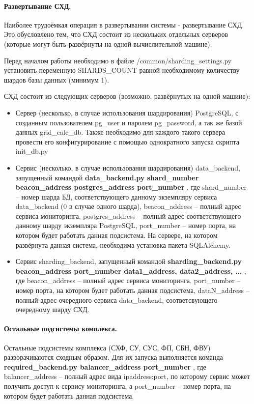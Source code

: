 \documentclass[a4paper,12pt]{report}
\numberwithin{equation}{section}
\begin{document}
  \paragraph{Развертывание СХД.}
  Наиболее трудоёмкая операция в развертывании системы - развертывание СХД. 
  Это обусловлено тем, что СХД состоит из нескольких отдельных серверов (которые могут быть развёрнуты на одной вычислительной машине).
  
  Перед началом работы необходимо в файле /common/sharding\_settings.py установить переменную SHARDS\_COUNT равной необходимому количеству шардов базы данных (минимум 1).
  
  СХД состоит из следующих серверов (возможно, развёрнутых на одной машине):
  \begin{itemize}
    \item Сервер (несколько, в случае использования шардирования) PostgreSQL, с созданным пользователем pg\_user и паролем pg\_password, а так же базой данных grid\_calc\_db. Также необходимо для каждого такого сервера провести его конфигурирование с помощью однократного запуска скрипта init\_db.py
    \item Сервис (несколько, в случае использования шардирования) data\_backend, запущенный командой 
    \textbf{ data\_backend.py shard\_number beacon\_address postgres\_address port\_number },
    где shard\_number -- номер шарда БД, соответствующего данному экземпляру сервиса data\_backend (0 в случае одного шарда),
    beacon\_address -- полный адрес сервиса мониторинга,
    postgres\_address -- полный адрес соответствующего данному шарду экземпляра PostgreSQL, 
    port\_number -- номер порта, на котором будет работать данная подсистема.
    На сервере, на котором развёрнута данная система, необходима установка пакета SQLAlchemy.
    \item Сервис sharding\_backend, запущенный командой 
    \textbf{ sharding\_backend.py beacon\_address port\_number data1\_address, data2\_address, ... },
    где beacon\_address -- полный адрес сервиса мониторинга,
    port\_number -- номер порта, на котором будет работать данная подсистема,
    dataN\_address -- полный адрес очередного сервиса data\_backend, соответсвующего очередному шарду СХД.
  \end{itemize}
  
  \paragraph{Остальные подсистемы комплекса.}
  Остальные подсистемы комплекса (СХФ, СУ, СУС, ФП, СБН, ФВУ) разворачиваются сходным образом.
  Для их запуска выполняется команда 
  \textbf{ required\_backend.py balancer\_address port\_number }
  , где balancer\_address -- полный адрес вида ipaddress:port, по которому сервис может получить доступ к сервису мониторинга,
  а port\_number -- номер порта, на котором будет работать данная подсистема.
  
\end{document}
